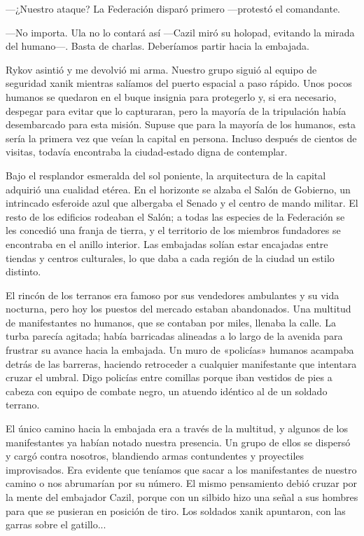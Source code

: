  —¿Nuestro ataque? La Federación disparó primero —protestó el comandante.

—No importa. Ula no lo contará así —Cazil miró su holopad, evitando la mirada del humano—. Basta de charlas. Deberíamos partir hacia la embajada.

Rykov asintió y me devolvió mi arma. Nuestro grupo siguió al equipo de seguridad xanik mientras salíamos del puerto espacial a paso rápido. Unos pocos humanos se quedaron en el buque insignia para protegerlo y, si era necesario, despegar para evitar que lo capturaran, pero la mayoría de la tripulación había desembarcado para esta misión. Supuse que para la mayoría de los humanos, esta sería la primera vez que veían la capital en persona. Incluso después de cientos de visitas, todavía encontraba la ciudad-estado digna de contemplar.

Bajo el resplandor esmeralda del sol poniente, la arquitectura de la capital adquirió una cualidad etérea. En el horizonte se alzaba el Salón de Gobierno, un intrincado esferoide azul que albergaba el Senado y el centro de mando militar. El resto de los edificios rodeaban el Salón; a todas las especies de la Federación se les concedió una franja de tierra, y el territorio de los miembros fundadores se encontraba en el anillo interior. Las embajadas solían estar encajadas entre tiendas y centros culturales, lo que daba a cada región de la ciudad un estilo distinto.

El rincón de los terranos era famoso por sus vendedores ambulantes y su vida nocturna, pero hoy los puestos del mercado estaban abandonados. Una multitud de manifestantes no humanos, que se contaban por miles, llenaba la calle. La turba parecía agitada; había barricadas alineadas a lo largo de la avenida para frustrar su avance hacia la embajada. Un muro de «policías» humanos acampaba detrás de las barreras, haciendo retroceder a cualquier manifestante que intentara cruzar el umbral. Digo policías entre comillas porque iban vestidos de pies a cabeza con equipo de combate negro, un atuendo idéntico al de un soldado terrano.

El único camino hacia la embajada era a través de la multitud, y algunos de los manifestantes ya habían notado nuestra presencia. Un grupo de ellos se dispersó y cargó contra nosotros, blandiendo armas contundentes y proyectiles improvisados. Era evidente que teníamos que sacar a los manifestantes de nuestro camino o nos abrumarían por su número. El mismo pensamiento debió cruzar por la mente del embajador Cazil, porque con un silbido hizo una señal a sus hombres para que se pusieran en posición de tiro. Los soldados xanik apuntaron, con las garras sobre el gatillo...

